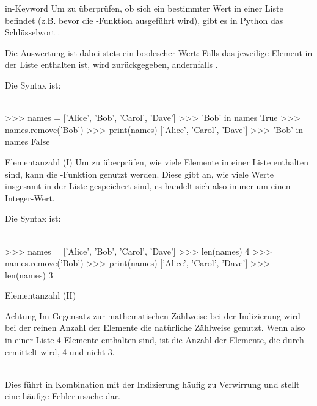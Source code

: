         
        \begin{frame}[fragile]{in-Keyword}
            Um zu überprüfen, ob sich ein bestimmter Wert in einer Liste befindet (z.B. bevor die -Funktion ausgeführt wird), gibt es in Python das Schlüsselwort . 
            
            Die Auswertung ist dabei stets ein boolescher Wert: Falls das jeweilige Element in der Liste enthalten ist, wird  zurückgegeben, andernfalls . 
            
            Die Syntax ist: \\~\
            
            
\begin{pyconcode}
>>> names = ['Alice', 'Bob', 'Carol', 'Dave']
>>> 'Bob' in names
True
>>> names.remove('Bob')
>>> print(names)
['Alice', 'Carol', 'Dave']
>>> 'Bob' in names
False
\end{pyconcode} 

        \end{frame}
        
        
        \begin{frame}[fragile]{Elementanzahl (I)}
            Um zu überprüfen, wie viele Elemente in einer Liste enthalten sind, kann die -Funktion genutzt werden. Diese gibt an, wie viele Werte insgesamt in der Liste gespeichert sind, es handelt sich also immer um einen Integer-Wert. 
            
            Die Syntax ist: \\~\
            
            
\begin{pyconcode}
>>> names = ['Alice', 'Bob', 'Carol', 'Dave']
>>> len(names)
4
>>> names.remove('Bob')
>>> print(names)
['Alice', 'Carol', 'Dave']
>>> len(names)
3
\end{pyconcode} 

        \end{frame}
        
        \begin{frame}[fragile]{Elementanzahl (II)}
            
            \begin{alertblock}{Achtung}
                Im Gegensatz zur mathematischen Zählweise bei der Indizierung wird bei der reinen Anzahl der Elemente die natürliche Zählweise genutzt. Wenn also in einer Liste 4 Elemente enthalten sind, ist die Anzahl der Elemente, die durch  ermittelt wird, 4 und nicht 3. \\~\
                
                Dies führt in Kombination mit der Indizierung häufig zu Verwirrung und stellt eine häufige Fehlerursache dar.
            \end{alertblock}
        \end{frame}
        
